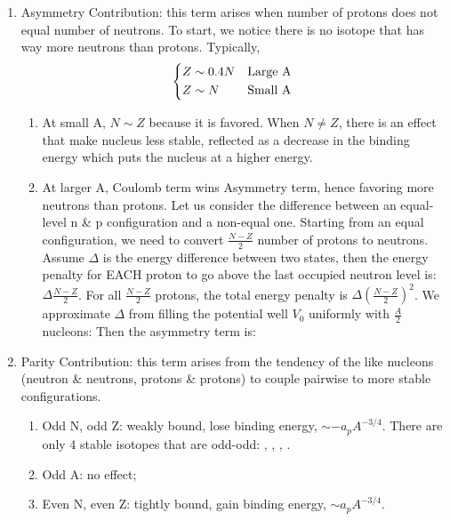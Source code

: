 \documentclass{school-22.101-notes}
\begin{document}
\begin{enumerate}
\begin{enumerate}
    \item Asymmetry Contribution: this term arises when number of protons does not equal number of neutrons. To start, we notice there is no isotope that has way more neutrons than protons. Typically, 
    \begin{align}
    \begin{dcases*}
    Z \sim 0.4 N & Large A \\
    Z \sim N & Small A
    \end{dcases*}
    \end{align}
    \begin{enumerate}
    \item At small A, $N \sim Z$ because it is favored. When $N \neq Z$, there is an effect that make nucleus less stable, reflected as a decrease in the binding energy which puts the nucleus at a higher energy. 
    \item At larger A, Coulomb term wins Asymmetry term, hence favoring more neutrons than protons. Let us consider the difference between an equal-level n \& p configuration and a non-equal one. Starting from an equal configuration, we need to convert $\frac{N-Z}{2}$ number of protons to neutrons. Assume $\Delta$ is the energy difference between two states, then the energy penalty for EACH proton to go above the last occupied neutron level is: $\Delta \frac{N-Z}{2}$. For all $\frac{N-Z}{2}$ protons, the total energy penalty is $\Delta \left( \frac{N-Z}{2} \right)^2$. We approximate $\Delta$ from filling the potential well $V_0$ uniformly with $\frac{A}{2}$ nucleons: 
    Then the asymmetry term is:
    \end{enumerate}

    \item Parity Contribution: this term arises from the tendency of the like nucleons (neutron \& neutrons, protons \& protons) to couple pairwise to more stable configurations.
    \begin{enumerate}
    \item Odd N, odd Z: weakly bound, lose binding energy, $\sim -a_p A^{-3/4}$. There are only 4 stable isotopes that are odd-odd: , ,  , . 
    \item Odd A: no effect;
    \item Even N, even Z: tightly bound, gain binding energy, $\sim a_p A^{-3/4}$.
    \end{enumerate}


\end{enumerate}
\end{enumerate}
\end{document}
